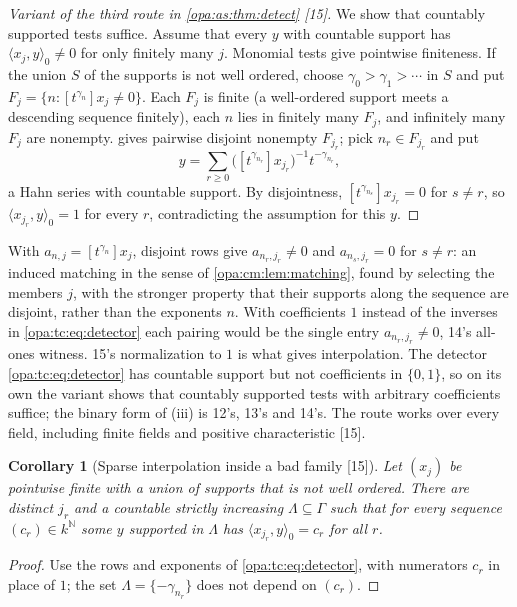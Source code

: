 \documentclass[11pt,oneside]{article}
\numberwithin{equation}{section}
\newtheorem{corollary}[corollary]{Corollary}
\theoremstyle{definition}
\theoremstyle{remark}
\newcommand{\N}{\mathbb N}
\newcommand{\coef}[2]{[t^{#1}]#2}
\newcommand{\src}[1]{\textup{\textsf{\small[#1]}}}
\newcommand{\pairing}[2]{\langle #1,#2\rangle_0}
\begin{document}
\begin{proof}[Variant of the third route in \cref{opa:as:thm:detect} \src{15}]
We show that countably supported tests suffice. Assume that every $y$ with countable support has
$\pairing{x_j}y\ne0$ for only finitely many $j$.
Monomial tests give pointwise finiteness. If the union $S$ of the supports is not well ordered, choose
$\gamma_0>\gamma_1>\cdots$ in $S$ and put $F_j=\{n:\coef{\gamma_n}{x_j}\ne0\}$. Each $F_j$ is finite (a well-ordered
support meets a descending sequence finitely), each $n$ lies in finitely many $F_j$, and infinitely many
$F_j$ are nonempty.  gives pairwise disjoint nonempty $F_{j_r}$; pick $n_r\in F_{j_r}$
and put
\begin{equation}\label{opa:tc:eq:detector}
 y=\sum_{r\ge0}\bigl(\coef{\gamma_{n_r}}{x_{j_r}}\bigr)^{-1}t^{-\gamma_{n_r}},
\end{equation}
a Hahn series with countable support. By disjointness, $\coef{\gamma_{n_s}}{x_{j_r}}=0$ for $s\ne r$, so
$\pairing{x_{j_r}}y=1$ for every $r$, contradicting the assumption for this $y$.
\end{proof}

With $a_{n,j}=\coef{\gamma_n}{x_j}$, disjoint rows give $a_{n_r,j_r}\ne0$ and $a_{n_s,j_r}=0$ for $s\ne r$: an
induced matching in the sense of \cref{opa:cm:lem:matching}, found by selecting the members $j$, with the
stronger property that their supports along the sequence are disjoint, rather than the exponents $n$.
With coefficients $1$ instead of the inverses in \eqref{opa:tc:eq:detector} each pairing would be the
single entry $a_{n_r,j_r}\ne0$, 14's all-ones witness. 15's normalization to $1$ is what gives interpolation. The detector
\eqref{opa:tc:eq:detector} has countable support but not coefficients in $\{0,1\}$, so on its own the
variant shows that countably supported tests with arbitrary coefficients suffice; the binary form of (iii) is 12's, 13's and 14's. The route works over every field,
including finite fields and positive characteristic \src{15}.

\begin{corollary}[Sparse interpolation inside a bad family \src{15}]\label{opa:tc:cor:interpolate}
Let $(x_j)$ be pointwise finite with a union of supports that is not well ordered. There are distinct
$j_r$ and a countable strictly increasing $\Lambda\subseteq\Gamma$ such that for every sequence $(c_r)\in k^\N$ some $y$
supported in $\Lambda$ has $\pairing{x_{j_r}}y=c_r$ for all $r$.
\end{corollary}
\begin{proof}
Use the rows and exponents of \eqref{opa:tc:eq:detector}, with numerators $c_r$ in place of $1$; the set
$\Lambda=\{-\gamma_{n_r}\}$ does not depend on $(c_r)$.
\end{proof}
\end{document}
